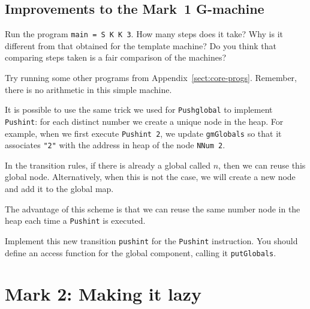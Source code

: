 \subsection{Improvements to the Mark~1 G-machine}

\begin{exercise}\label{gm:X:run}
Run the program \mbox{\tt main\ =\ S\ K\ K\ 3}.  How many steps does it take? Why
is it different from that obtained for the template machine? Do you
think that comparing steps taken is a fair comparison of the machines?
\end{exercise}

\begin{exercise}\label{gm:X:runagain}
Try running some other programs from Appendix~\ref{sect:core-progs}.
Remember, there is no arithmetic in this simple machine.
\end{exercise}

\begin{exercise}\label{gm:X:pushint}
It is possible to use the same trick we used for \mbox{\tt Pushglobal} to
implement \mbox{\tt Pushint}: for each distinct number we create a unique node
in the heap. For example, when we first execute \mbox{\tt Pushint\ 2}, we update
\mbox{\tt gmGlobals} so that it associates \mbox{\tt "2"} with the address in heap of
the node \mbox{\tt NNum\ 2}.

In the transition rules, if there is already a global called $n$,
then we can reuse this global node.
\gmrule%
{}%
{}
Alternatively, when this is not the case, we will create a new node
and add it to the global map.
\gmrule%
{}%
{}

The advantage of this scheme is that we can reuse the same number node in
the heap each time a \mbox{\tt Pushint} is executed.

Implement this new transition \mbox{\tt pushint} for the \mbox{\tt Pushint} instruction.
You should define an access function for the global component, calling
it \mbox{\tt putGlobals}.
\end{exercise}

\section{Mark 2: Making it lazy}
\label{gm:sc:mark2}


